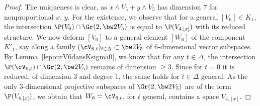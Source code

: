 \begin{proof} The uniqueness is clear, as $x\wedge V_5+y\wedge V_5$ has dimension $7$
for nonproportional $x,\,y$. For the existence, we observe that for a general $[V_6]\in K_1$, the intersection $\P(V_6)\cap \Gr(2, \bw2V_5)$ is equal to
$\P(V_{4,[x]})$ with its reduced structure.
We now deform $[V_6]$ to a general element $[W_6]$ of the component $K'_1$, say along
a family $(\cV _{6,t})_{t\in \Delta}\subset \bw2V_5$ of
$6$-dimensional vector subspaces.
By Lemma~\ref{lepourV6dansKsigma0},
we know that for any $t\in \Delta$, the intersection $\P(\cV _{6,t})\cap \Gr(2, \bw2V_5)$ remains of dimension $\geq3$. Since for $t=0$ it is reduced, of dimension $3$ and degree $1$,
the same holds for $t\in \Delta$ general. As the only $3$-dimensional projective subspaces
of $\Gr(2, \bw2V_5)$ are of the form $\P(V_{4,[x]})$, we obtain that $W_6=\cV _{6,t}$, for $t$ general, contains a space $V_{4,[x]}$.
\end{proof}

